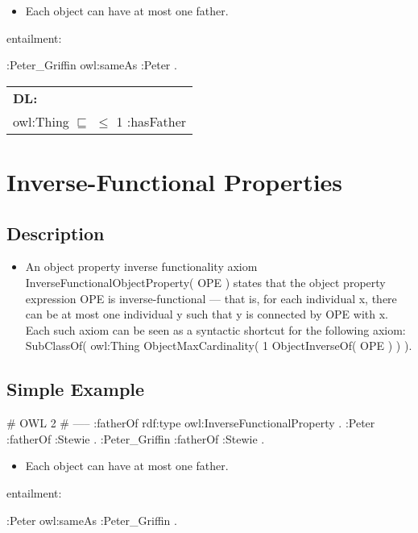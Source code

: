 \documentclass{llncs}
\newenvironment{DL}{
  \scriptsize
  \sffamily
  \vspace{0.3cm}
  \begin{tabular}{l}
	\textbf{DL:} \\

}{
  \end{tabular}
  \linebreak
}
\begin{document}
\begin{itemize}
	\item Each object can have at most one father. 
\end{itemize}

entailment:

\begin{ex}
:Peter_Griffin owl:sameAs :Peter .  
\end{ex}

\begin{DL}
owl:Thing $\sqsubseteq$ $\leq$ 1 :hasFather
\end{DL}

\section{Inverse-Functional Properties}

\subsection{Description}

\begin{itemize}
	\item An object property inverse functionality axiom InverseFunctionalObjectProperty( OPE ) states that the object property expression OPE is inverse-functional — that is, for each individual x, there can be at most one individual y such that y is connected by OPE with x. Each such axiom can be seen as a syntactic shortcut for the following axiom: SubClassOf( owl:Thing ObjectMaxCardinality( 1 ObjectInverseOf( OPE ) ) ).
\end{itemize}

\subsection{Simple Example}

\begin{ex}
# OWL 2
# -----
:fatherOf rdf:type owl:InverseFunctionalProperty . 	
:Peter :fatherOf :Stewie .
:Peter_Griffin :fatherOf :Stewie .
\end{ex}

\begin{itemize}
	\item Each object can have at most one father. 
\end{itemize}

entailment:

\begin{ex}
:Peter owl:sameAs :Peter_Griffin . 
\end{ex}
\end{document}
